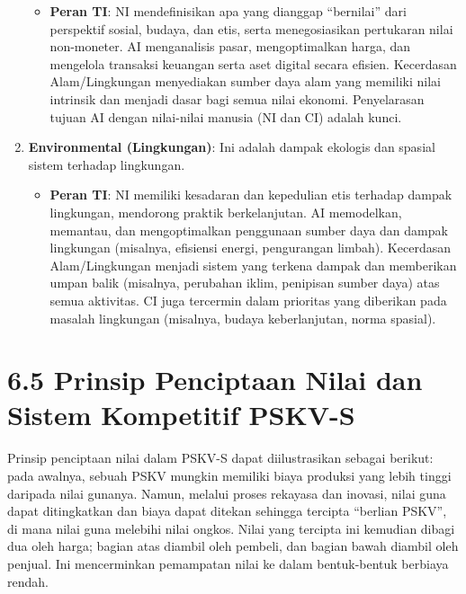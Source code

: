 \documentclass[
  letterpaper,
  DIV=11,
  numbers=noendperiod]{scrreprt}
\providecommand{\tightlist}{%
  \setlength{\itemsep}{0pt}\setlength{\parskip}{0pt}}
\begin{document}
\begin{enumerate}
  \begin{itemize}
  \tightlist
  \item
    \textbf{Peran TI}: NI mendefinisikan apa yang dianggap ``bernilai''
    dari perspektif sosial, budaya, dan etis, serta menegosiasikan
    pertukaran nilai non-moneter. AI menganalisis pasar, mengoptimalkan
    harga, dan mengelola transaksi keuangan serta aset digital secara
    efisien. Kecerdasan Alam/Lingkungan menyediakan sumber daya alam
    yang memiliki nilai intrinsik dan menjadi dasar bagi semua nilai
    ekonomi. Penyelarasan tujuan AI dengan nilai-nilai manusia (NI dan
    CI) adalah kunci.
  \end{itemize}
\item
  \textbf{Environmental (Lingkungan)}: Ini adalah dampak ekologis dan
  spasial sistem terhadap lingkungan.

  \begin{itemize}
  \tightlist
  \item
    \textbf{Peran TI}: NI memiliki kesadaran dan kepedulian etis
    terhadap dampak lingkungan, mendorong praktik berkelanjutan. AI
    memodelkan, memantau, dan mengoptimalkan penggunaan sumber daya dan
    dampak lingkungan (misalnya, efisiensi energi, pengurangan limbah).
    Kecerdasan Alam/Lingkungan menjadi sistem yang terkena dampak dan
    memberikan umpan balik (misalnya, perubahan iklim, penipisan sumber
    daya) atas semua aktivitas. CI juga tercermin dalam prioritas yang
    diberikan pada masalah lingkungan (misalnya, budaya keberlanjutan,
    norma spasial).
  \end{itemize}
\end{enumerate}

\section{\texorpdfstring{\textbf{6.5 Prinsip Penciptaan Nilai dan Sistem
Kompetitif
PSKV-S}}{6.5 Prinsip Penciptaan Nilai dan Sistem Kompetitif PSKV-S}}\label{prinsip-penciptaan-nilai-dan-sistem-kompetitif-pskv-s}

Prinsip penciptaan nilai dalam PSKV-S dapat diilustrasikan sebagai
berikut: pada awalnya, sebuah PSKV mungkin memiliki biaya produksi yang
lebih tinggi daripada nilai gunanya. Namun, melalui proses rekayasa dan
inovasi, nilai guna dapat ditingkatkan dan biaya dapat ditekan sehingga
tercipta ``berlian PSKV'', di mana nilai guna melebihi nilai ongkos.
Nilai yang tercipta ini kemudian dibagi dua oleh harga; bagian atas
diambil oleh pembeli, dan bagian bawah diambil oleh penjual. Ini
mencerminkan pemampatan nilai ke dalam bentuk-bentuk berbiaya rendah.
\end{document}
